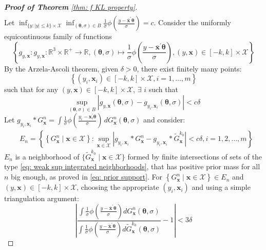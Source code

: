 \begin{proof}[\hypertarget{proof of thm KL property}{\textbf{Proof of Theorem}} \ref{thm: f KL property}]
$$\begin{aligned}
\end{aligned}
$$
Let $\inf _{\{y:|y| \leq k\} \times \mathcal{X}} \inf _{(\boldsymbol{\theta}, \sigma) \in B} \frac{1}{\sigma} \phi\left(\frac{y-\bar{\boldsymbol{x}}^{\prime} \boldsymbol{\theta}}{\sigma}\right)=c$. Consider the uniformly equicontinuous family of functions
$$
\left\{g_{y, \boldsymbol{x}}: g_{y, \boldsymbol{x}}: \mathbb{R}^3 \times \mathbb{R}^{+} \rightarrow \mathbb{R},(\boldsymbol{\theta}, \sigma) \mapsto \frac{1}{\sigma} \phi\left(\frac{y-\bar{\boldsymbol{x}}^{\prime} \boldsymbol{\theta}}{\sigma}\right),(y, \boldsymbol{x}) \in[-k, k] \times \mathcal{X}\right\}
$$
By the Arzela-Ascoli theorem, given $\delta>0$, there exist finitely many points: 
$$\left\{\left(y_i, \boldsymbol{x}_i\right) \in[-k, k] \times \mathcal{X}, i=1, \ldots, m\right\}$$ 
such that for any $(y, \boldsymbol{x}) \in[-k, k] \times \mathcal{X}$, $\exists \, \, i$ such that
$$
\sup _{(\boldsymbol{\theta}, \sigma) \in B}\left|g_{y, \boldsymbol{x}}(\boldsymbol{\theta}, \sigma)-g_{y_i, \boldsymbol{x}_i}(\boldsymbol{\theta}, \sigma)\right|<c \delta
$$
Let $g_{y_i, \boldsymbol{x}_i} * G^n_{\boldsymbol{x}}=\int \frac{1}{\sigma}  \phi(\frac{y_i-\boldsymbol{x}_i^{\prime} \boldsymbol{\theta}}{\sigma} ) \,  d G^n_{\boldsymbol{x}}(\boldsymbol{\theta}, \sigma)$ and consider:
$$
\begin{aligned}
    &E_n=\left\{\left\{G^n_{\boldsymbol{x}} \mid \boldsymbol{x} \in \mathcal{X}\right\}: \sup _{\boldsymbol{x} \in \mathcal{X}}\left|g_{y_i, \boldsymbol{x}_i} * G^n_{\boldsymbol{x}}-g_{y_i, \boldsymbol{x}_i} * \tilde{G}^{k_0}_{\boldsymbol{x}}\right|<c \delta, i=1,2, \ldots, m\right\}
\end{aligned}
$$
$E_n$ is a neighborhood of $\{\tilde{G}^{k_0}_{\boldsymbol{x}} \mid \boldsymbol{x} \in \mathcal{X}\}$ formed by finite intersections of sets of the type \eqref{eq: weak sup integrated neighborhoods}, that has positive prior mass for all $n$ big enough, as proved in \eqref{eq: prior support}. For $\left\{G^n_{\boldsymbol{x}} \mid \boldsymbol{x} \in \mathcal{X}\right\} \in E_n$ and $(y, \boldsymbol{x}) \in[-k, k] \times \mathcal{X}$, choosing the appropriate $(y_i,\boldsymbol{x}_i)$ and using a simple triangulation argument:
$$
\left|\frac{\int \frac{1}{\sigma} \phi\left(\frac{y-\bar{\boldsymbol{x}}^{\prime} \boldsymbol{\theta}}{\sigma}\right) d G^n_{\boldsymbol{x}}(\boldsymbol{\theta}, \sigma)}{\int \frac{1}{\sigma} \phi\left(\frac{y-\bar{\boldsymbol{x}}^{\prime} \boldsymbol{\theta}}{\sigma}\right) d \tilde{G}^{k_0}_{\boldsymbol{x}}(\boldsymbol{\theta}, \sigma)}-1\right|<3 \delta
$$
\end{proof}
